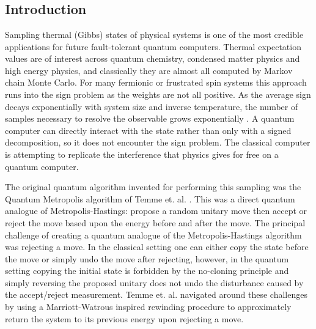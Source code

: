 
\ifpdf
    \graphicspath{{Chapter4/Figs/Raster/}{Chapter4/Figs/PDF/}{Chapter4/Figs/}{Chapter4/}}
\else
    \graphicspath{{Chapter4/Figs/Vector/}{Chapter4/Figs/}{Chapter4/}}
\fi


\chapter{}
\label{chapter:quantum_metropolis}
\section{Introduction}
Sampling thermal (Gibbs) states of physical systems is one of the most credible applications for future fault-tolerant quantum computers. Thermal expectation values are of interest across quantum chemistry, condensed matter physics and high energy physics, and classically they are almost all computed by Markov chain Monte Carlo. For many fermionic or frustrated spin systems this approach runs into the sign problem as the weights are not all positive. As the average sign decays exponentially with system size and inverse temperature, the number of samples necessary to resolve the observable grows exponentially \cite{Troyer_2005}. A quantum computer can directly interact with the state rather than only with a signed decomposition, so it does not encounter the sign problem. The classical computer is attempting to replicate the interference that physics gives for free on a quantum computer.

The original quantum algorithm invented for performing this sampling was the Quantum Metropolis algorithm of Temme et. al. \cite{Temme_2011}. This was a direct quantum analogue of Metropolis-Hastings: propose a random unitary move then accept or reject the move based upon the energy before and after the move. The principal challenge of creating a quantum analogue of the Metropolis-Hastings algorithm was rejecting a move. In the classical setting one can either copy the state before the move or simply undo the move after rejecting, however, in the quantum setting copying the initial state is forbidden by the no-cloning principle and simply reversing the proposed unitary does not undo the disturbance caused by the accept/reject measurement. Temme et. al. \cite{Temme_2011} navigated around these challenges by using a Marriott-Watrous \cite{MarriottWatrous} inspired rewinding procedure to approximately return the system to its previous energy upon rejecting a move.

